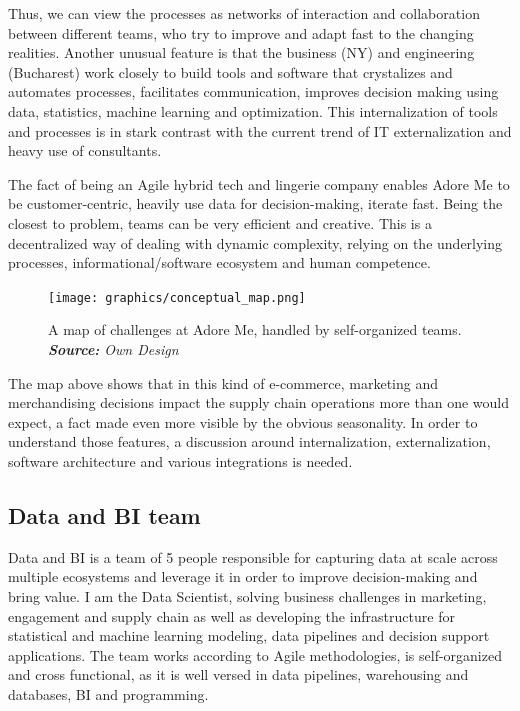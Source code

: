 \documentclass[12pt]{article}
\begin{document}
Thus, we can view the processes as networks of interaction and collaboration between different teams, who try to improve and adapt fast to the changing realities. Another unusual feature is that the business (NY) and engineering (Bucharest) work closely to build tools and software that crystalizes and automates processes, facilitates communication, improves decision making using data, statistics, machine learning and optimization. This internalization of tools and processes is in stark contrast with the current trend of IT externalization and heavy use of consultants. 

The fact of being an Agile hybrid tech and lingerie company enables Adore Me to be customer-centric, heavily use data for decision-making, iterate fast. Being the closest to problem, teams can be very efficient and creative. This is a decentralized way of dealing with dynamic complexity, relying on the underlying processes, informational/software ecosystem and human competence.

\begin{figure}[!ht]
	\centering
	\texttt{[image: graphics/conceptual\_map.png]}%
	\caption{A map of challenges at Adore Me, handled by self-organized teams.  \\
		\textit{\textbf{Source:} Own Design}}
\end{figure}


The map above shows that in this kind of e-commerce, marketing and merchandising decisions impact the supply chain operations more than one would expect, a fact made even more visible by the obvious seasonality. In order to understand those features, a discussion around  internalization, externalization, software architecture and various integrations is needed. 



\subsection{Data and BI team}

Data and BI is a team of 5 people responsible for capturing data at scale across multiple ecosystems and leverage it in order to improve decision-making and bring value. I am the Data Scientist, solving business challenges in marketing, engagement and supply chain as well as developing the infrastructure for statistical and machine learning modeling, data pipelines and decision support applications. The team works according to Agile methodologies, is self-organized and cross functional, as it is well versed in data pipelines, warehousing and databases, BI and programming. 
\end{document}
